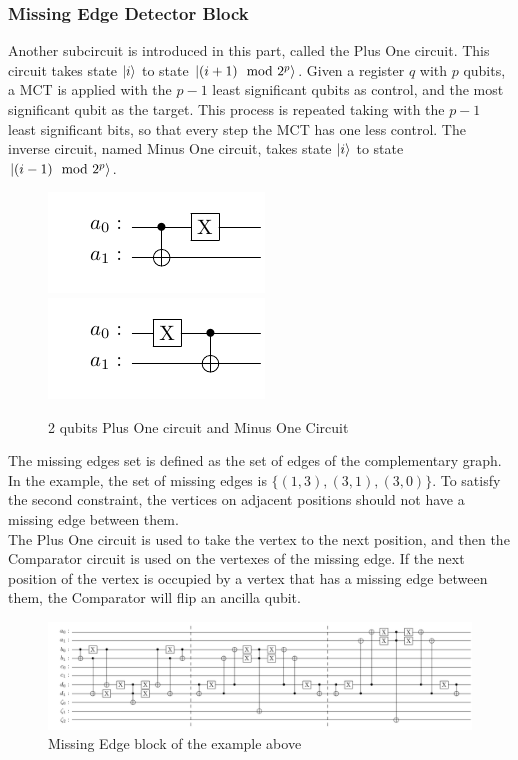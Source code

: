 \documentclass[10pt,a4paper]{article}
\begin{document}
\subsubsection*{Missing Edge Detector Block}

Another subcircuit is introduced in this part, called the Plus One circuit. This circuit takes state $\ket{i}$ to state $\ket{(i+1) \mod 2^p}$. Given a register $q$ with $p$ qubits, a MCT is applied with the $p-1$ least significant qubits as control, and the most significant qubit as the target. This process is repeated taking with the $p-1$ least significant bits, so that every step the MCT has one less control. The inverse circuit, named Minus One circuit, takes state $\ket{i}$ to state $\ket{(i-1) \mod 2^p}$.
\begin{figure}[hbtp]
\centering
\includegraphics[scale=1]{figures/plus_one.pdf}
\includegraphics[scale=1]{figures/minus_one.pdf}
\caption{2 qubits Plus One circuit and Minus One Circuit}
\end{figure}

The missing edges set is defined as the set of edges of the complementary graph. In the example, the set of missing edges is $\{(1,3),(3,1),(3,0)\}$. To satisfy the second constraint, the vertices on adjacent positions should not have a missing edge between them.\\
The Plus One circuit is used to take the vertex to the next position, and then the Comparator circuit is used on the vertexes of the missing edge. If the next position of the vertex is occupied by a vertex that has a missing edge between them, the Comparator will flip an ancilla qubit.
\begin{figure}[hbtp]
\centering
\includegraphics[scale=0.5]{figures/missing_edge.pdf}
\caption{Missing Edge block of the example above}
\end{figure}
\end{document}
